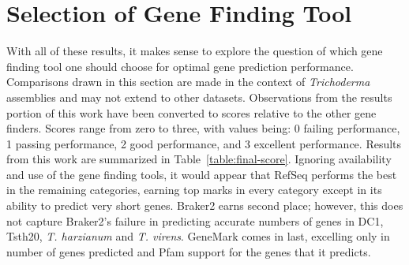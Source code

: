 \section{Selection of Gene Finding Tool}\label{chapter:conclusion}

With all of these results, it makes sense to explore the question of
which gene finding tool one should choose for optimal gene prediction
performance. Comparisons drawn in this section are made in the context
of \textit{Trichoderma} assemblies and may not extend to other
datasets. Observations from the results portion of this work have been
converted to scores relative to the other gene finders. Scores range
from zero to three, with values being: 0 \- failing performance, 1 \-
passing performance, 2 \- good performance, and 3 \- excellent
performance. Results from this work are summarized in
Table~\ref{table:final-score}. Ignoring availability and use of the
gene finding tools, it would appear that RefSeq performs the best in
the remaining categories, earning top marks in every category except
in its ability to predict very short genes. Braker2 earns second
place; however, this does not capture Braker2's failure in predicting
accurate numbers of genes in DC1, Tsth20, \textit{T. harzianum} and
\textit{T. virens}. GeneMark comes in last, excelling only in number
of genes predicted and Pfam support for the genes that it predicts.

